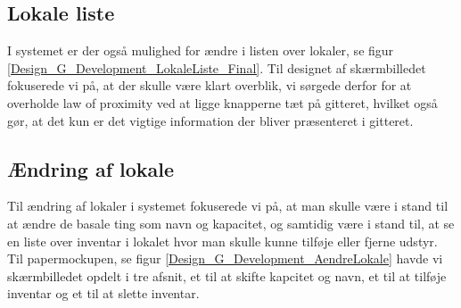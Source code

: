 {

\subsection{Lokale liste}
I systemet er der også mulighed for ændre i listen over lokaler, se figur \ref{Design_G_Development_LokaleListe_Final}. Til designet af skærmbilledet fokuserede vi på, at der skulle være klart overblik, vi sørgede derfor for at overholde law of proximity ved at ligge knapperne tæt på gitteret, hvilket også gør, at det kun er det vigtige information der bliver præsenteret i gitteret.

\subsection{Ændring af lokale}
Til ændring af lokaler i systemet fokuserede vi på, at man skulle være i stand til at ændre de basale ting som navn og kapacitet, og samtidig være i stand til, at se en liste over inventar i lokalet hvor man skulle kunne tilføje eller fjerne udstyr. Til papermockupen, se figur \ref{Design_G_Development_AendreLokale} havde vi skærmbilledet opdelt i tre afsnit, et til at skifte kapcitet og navn, et til at tilføje inventar og et til at slette inventar.

}
